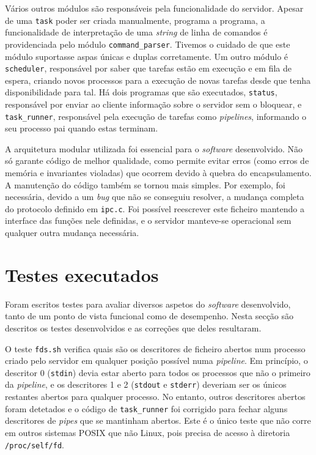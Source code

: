 \documentclass[11pt]{article}
\begin{document}
Vários outros módulos são responsáveis pela funcionalidade do servidor. Apesar de uma \texttt{task}
poder ser criada manualmente, programa a programa, a funcionalidade de interpretação de uma
\emph{string} de linha de comandos é providenciada pelo módulo \texttt{command\_parser}. Tivemos o
cuidado de que este módulo suportasse aspas únicas e duplas corretamente. Um outro módulo é
\texttt{scheduler}, responsável por saber que tarefas estão em execução e em fila de espera, criando
novos processos para a execução de novas tarefas desde que tenha disponibilidade para tal. Há dois
programas que são executados, \texttt{status}, responsável por enviar ao cliente informação sobre o
servidor sem o bloquear, e \texttt{task\_runner}, responsável pela execução de tarefas como
\emph{pipelines}, informando o seu processo pai quando estas terminam.

A arquitetura modular utilizada foi essencial para o \emph{software} desenvolvido. Não só garante
código de melhor qualidade, como permite evitar erros (como erros de memória e invariantes violadas)
que ocorrem devido à quebra do encapsulamento. A manutenção do código também se tornou mais simples.
Por exemplo, foi necessária, devido a um \emph{bug} que não se conseguiu resolver, a mudança
completa do protocolo definido em \texttt{ipc.c}. Foi possível reescrever este ficheiro mantendo a
interface das funções nele definidas, e o servidor manteve-se operacional sem qualquer outra mudança
necessária.

\section{Testes executados}

Foram escritos testes para avaliar diversos aspetos do \emph{software} desenvolvido, tanto de um
ponto de vista funcional como de desempenho. Nesta secção são descritos os testes desenvolvidos e
as correções que deles resultaram.

O teste \texttt{fds.sh} verifica quais são os descritores de ficheiro abertos num processo criado
pelo servidor em qualquer posição possível numa \emph{pipeline}. Em princípio, o descritor 0
(\texttt{stdin}) devia estar aberto para todos os processos que não o primeiro da \emph{pipeline}, e
os descritores 1 e 2 (\texttt{stdout} e \texttt{stderr}) deveriam ser os únicos restantes abertos
para qualquer processo. No entanto, outros descritores abertos foram detetados e o código de
\texttt{task\_runner} foi corrigido para fechar alguns descritores de \emph{pipes} que se mantinham
abertos. Este é o único teste que não corre em outros sistemas POSIX que não Linux, pois precisa de
acesso à diretoria \texttt{/proc/self/fd}.
\end{document}
